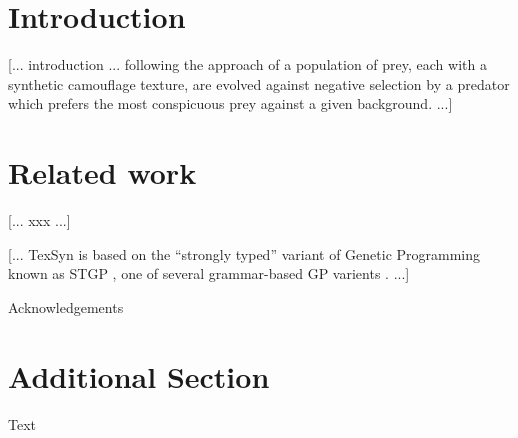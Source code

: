 \documentclass[sigconf]{acmart}
\begin{document}
\maketitle


\section{Introduction}
[... introduction ... following the approach of \citet{Reynolds2011} a population of prey, each with a synthetic camouflage texture, are evolved against negative selection by a predator which prefers the most conspicuous prey against a given background. ...]

\section{Related work}
[... xxx ...]

[... TexSyn is based on the “strongly typed” variant of Genetic Programming known as STGP \cite{montana_strongly_1995}, one of several grammar-based GP varients \cite{Mckay_2010}. ...]

\begin{acks}
Acknowledgements
\end{acks}


% 



\appendix

\section{Additional Section}

Text
\end{document}
